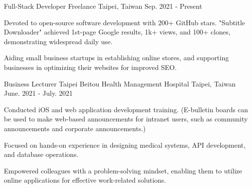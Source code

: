 

\begin{cventries}

  \cventry
    {Full-Stack Developer} %
    {Freelance} %
    {Taipei, Taiwan} %
    {Sep. 2021 - Present} %
    {
      \begin{cvitems} %
        \item {Devoted to open-source software development with 200+ GitHub stars. "Subtitle Downloader" achieved 1st-page Google results, 1k+ views, and 100+ clones, demonstrating widespread daily use.}
        \item {Aiding small business startups in establishing online stores, and supporting businesses in optimizing their websites for improved SEO.}
      \end{cvitems}
    }

  \cventry
  {Business Lecturer} %
  {Taipei Beitou Health Management Hospital} %
  {Taipei, Taiwan} %
  {June. 2021 - July. 2021} %
  {
    \begin{cvitems} %
      \item {Conducted iOS and web application development training. (E-bulletin boards can be used to make web-based announcements for intranet users, such as community announcements and corporate announcements.)}
      \item {Focused on hands-on experience in designing medical systems, API development, and database operations.}
      \item {Empowered colleagues with a problem-solving mindset, enabling them to utilize online applications for effective work-related solutions.}
    \end{cvitems}
  }


\end{cventries}
